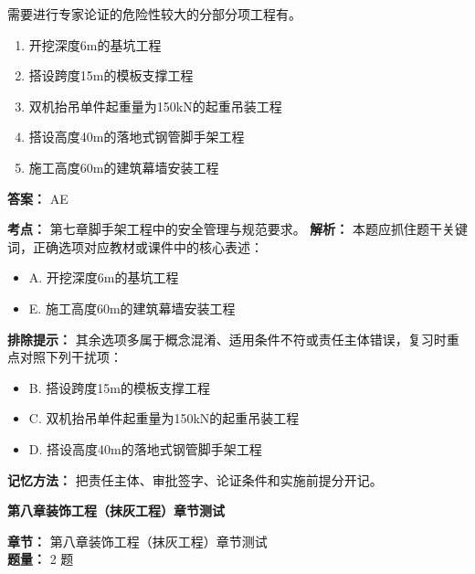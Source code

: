 \documentclass[UTF8,fontset=fandol,11pt]{ctexart}
\newcommand{\chaptertitle}[1]{\vspace{0.5em}\begin{tcolorbox}[enhanced,colback=deepblue,colframe=deepblue,arc=2mm,boxrule=0pt]\begin{center}\Large\bfseries\color{white}#1\end{center}\end{tcolorbox}\vspace{0.5em}}
\begin{document}
\begin{quizbox}[title={第 10 题}]
需要进行专家论证的危险性较大的分部分项工程有。\\
\begin{enumerate}[label=\Alph*.]
\item 开挖深度6m的基坑工程
\item 搭设跨度15m的模板支撑工程
\item 双机抬吊单件起重量为150kN的起重吊装工程
\item 搭设高度40m的落地式钢管脚手架工程
\item 施工高度60m的建筑幕墙安装工程
\end{enumerate}
\textbf{答案：} AE
\vspace{0.25em}
\begin{answerbox}[title={考点解析}]
\textbf{考点：} 第七章脚手架工程中的安全管理与规范要求。
\textbf{解析：} 本题应抓住题干关键词，正确选项对应教材或课件中的核心表述：
\begin{itemize}
\item A. 开挖深度6m的基坑工程
\item E. 施工高度60m的建筑幕墙安装工程
\end{itemize}
\textbf{排除提示：} 其余选项多属于概念混淆、适用条件不符或责任主体错误，复习时重点对照下列干扰项：
\begin{itemize}
\item B. 搭设跨度15m的模板支撑工程
\item C. 双机抬吊单件起重量为150kN的起重吊装工程
\item D. 搭设高度40m的落地式钢管脚手架工程
\end{itemize}
\textbf{记忆方法：} 把责任主体、审批签字、论证条件和实施前提分开记。
\end{answerbox}
\end{quizbox}

\vspace{0.2em}

\chaptertitle{第八章装饰工程（抹灰工程）章节测试}
\begin{mainbox}
\textbf{\textcolor{mainblue}{章节：}} 第八章装饰工程（抹灰工程）章节测试\\
\textbf{\textcolor{answerred}{题量：}} 2 题
\end{mainbox}
\end{document}
